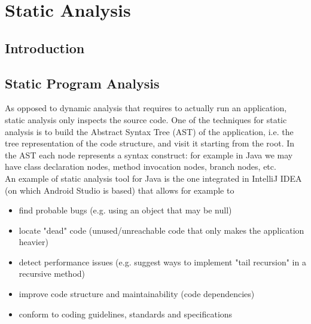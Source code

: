 \documentclass[11pt,a4paper,notitlepage]{article}
\begin{document}
\section{Static Analysis}

\subsection{Introduction}

\subsection{Static Program Analysis}
As opposed to dynamic analysis that requires to actually run an application, static analysis only inspects the source code. One of the techniques for static analysis is  to build the Abstract Syntax Tree (AST) of the application, i.e. the tree representation of the code structure, and visit it starting from the root. In the AST each node represents a syntax construct: for example in Java we may have class declaration nodes, method invocation nodes, branch nodes, etc.\medskip \\
An example of static analysis tool for Java is the one integrated in IntelliJ IDEA (on which Android Studio is based) that allows for example to
\begin{itemize}
	\item find probable bugs (e.g. using an object that may be null)
	\item locate "dead" code (unused/unreachable code that only makes the application heavier)
	\item detect performance issues (e.g. suggest ways to implement "tail recursion" in a recursive method)
	\item improve code structure and maintainability (code dependencies)
	\item conform to coding guidelines, standards and specifications
\end{itemize}
\end{document}
